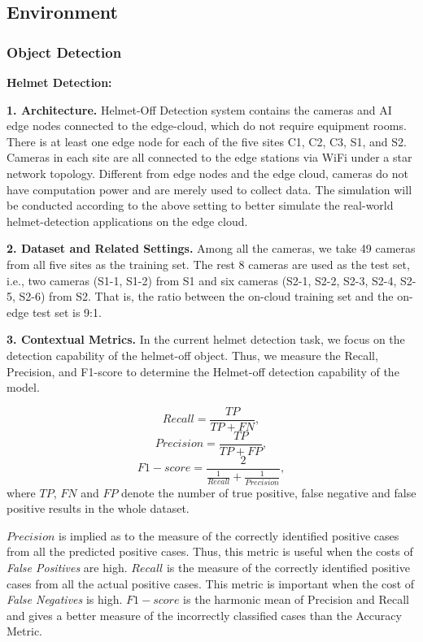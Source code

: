 

\subsection{Environment}


\subsubsection{Object Detection}
\textbf{Helmet Detection:} 

\textbf{1. Architecture.} Helmet-Off Detection system contains the cameras and AI edge nodes connected to the edge-cloud, which do not require equipment rooms. There is at least one edge node for each of the five sites C1, C2, C3, S1, and S2. Cameras in each site are all connected to the edge stations via WiFi under a star network topology. Different from edge nodes and the edge cloud, cameras do not have computation power and are merely used to collect data. The simulation will be conducted according to the above setting to better simulate the real-world helmet-detection applications on the edge cloud.

\textbf{2. Dataset and Related Settings.} Among all the cameras, we take 49 cameras from all five sites as the training set. The rest 8 cameras are used as the test set, i.e., two cameras (S1-1, S1-2) from S1 and six cameras (S2-1, S2-2, S2-3, S2-4, S2-5, S2-6) from S2. That is, the ratio between the on-cloud training set and the on-edge test set is 9:1. 

\textbf{3. Contextual Metrics.} In the current helmet detection task, we focus on the detection capability of the helmet-off object. Thus, we measure the Recall, Precision, and F1-score to determine the Helmet-off detection capability of the model. 

\begin{equation} \label{equ:recall} 
Recall = \frac{TP}{TP + FN}, 
\end{equation}
\begin{equation} \label{equ:precision} 
Precision = \frac{TP}{TP + FP}, 
\end{equation}
\begin{equation} \label{equ:f1} 
F1-score = \frac{ 2 } {\frac{1}{Recall} + \frac{1}{Precision}},
\end{equation}
where $TP$, $FN$ and $FP$ denote the number of true positive, false negative and false positive results in the whole dataset. 

$Precision$ is implied as to the measure of the correctly identified positive cases from all the predicted positive cases. Thus, this metric is useful when the costs of \textit{False Positives} are high. $Recall$ is the measure of the correctly identified positive cases from all the actual positive cases. This metric is important when the cost of \textit{False Negatives} is high. $F1-score$ is the harmonic mean of Precision and Recall and gives a better measure of the incorrectly classified cases than the Accuracy Metric.

